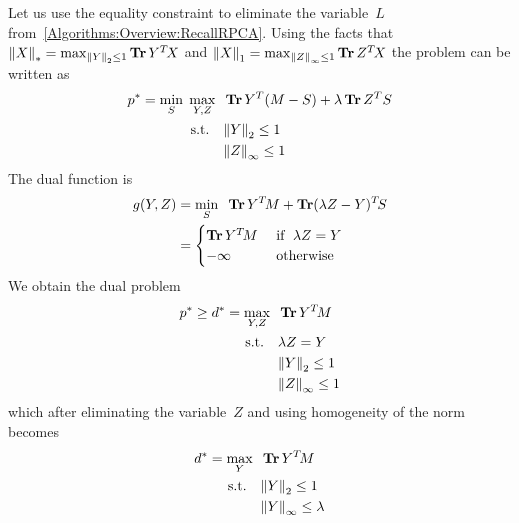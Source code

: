 Let us use the equality constraint to eliminate the variable~$L$ from~\eqref{Algorithms:Overview:RecallRPCA}. Using the facts that ${\left\|X\right\|}_{*}^{} = \max_{{\left\|Y\right\|}_{2}^{}\leq 1} \operatorname{\mathbf{Tr}} Y^T\!X$ and ${\left\|X\right\|}_{1}^{} = \max_{{\left\|Z\right\|}_{\infty}^{}\leq 1} \operatorname{\mathbf{Tr}} Z^T\!X$  the problem can be written as
%
\begin{align}
\begin{split}
p^* = \min_S \;\max_{Y,Z} \;\; &\operatorname{\mathbf{Tr}} Y^T(M-S) + \lambda \operatorname{\mathbf{Tr}} Z^TS \\
\text{s.t.} \quad & {\left\|Y\right\|}_{2}^{}\leq 1 \\
&{\left\|Z\right\|}_{\infty}^{}\leq 1
\end{split}
\label{Algorithms:MainAlgs:IPM:SDPform:NoNorms}
\end{align}
%
The dual function is 
\begin{align}
\begin{split}
g(Y,Z) &= \min_S \;\; \operatorname{\mathbf{Tr}} Y^T\!M + \operatorname{\mathbf{Tr}} (\lambda Z-Y)^T\!S \\
&= \begin{cases}
\operatorname{\mathbf{Tr}} Y^T\!M  & \text{ if } \; \lambda Z = Y \\
-\infty & \text{ otherwise }
\end{cases} 
\end{split}
\label{Algorithms:MainAlgs:IPM:SDPform:DualFunct}
\end{align}
%
We obtain the dual problem 
\begin{align}
\begin{split}
p^* \geq d^* = \max_{Y,Z} \;\; &\operatorname{\mathbf{Tr}} Y^T\!M \\
\text{s.t.} \quad & \lambda Z = Y \\
&{\left\|Y\right\|}_{2}^{}\leq 1 \\
&{\left\|Z\right\|}_{\infty}^{}\leq 1
\end{split}
\label{Algorithms:MainAlgs:IPM:SDPform:DualProb}
\end{align}
%
which after eliminating the variable~$Z$ and using homogeneity of the norm becomes
\begin{align}
\begin{split}
d^* = \max_{Y} \;\; &\operatorname{\mathbf{Tr}} Y^T\!M \\
\text{s.t.} \quad & {\left\|Y\right\|}_{2}^{}\leq 1 \\
&{\left\|Y\right\|}_{\infty}^{}\leq \lambda
\end{split}
\label{Algorithms:MainAlgs:IPM:SDPform:DualSimpler}
\end{align}


